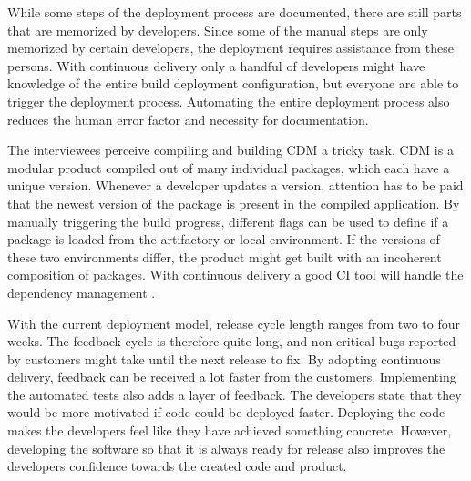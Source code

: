 \documentclass[english]{tktltiki2}
\theoremstyle{definition}
\theoremstyle{remark}
\begin{document}
While some steps of the deployment process are documented, there are still parts that are memorized by developers. Since some of the manual steps are only memorized by certain developers, the deployment requires assistance from these persons. With continuous delivery only a handful of developers might have knowledge of the entire build deployment configuration, but everyone are able to trigger the deployment process. Automating the entire deployment process also reduces the human error factor and necessity for documentation.

The interviewees perceive compiling and building CDM a tricky task. CDM is a modular product compiled out of many individual packages, which each have a unique version. Whenever a developer updates a version, attention has to be paid that the newest version of the package is present in the compiled application. By manually triggering the build progress, different flags can be used to define if a package is loaded from the artifactory or local environment. If the versions of these two environments differ, the product might get built with an incoherent composition of packages. With continuous delivery a good CI tool will handle the dependency management \cite{cdbook}.



With the current deployment model, release cycle length ranges from two to four weeks. The feedback cycle is therefore quite long, and non-critical bugs reported by customers might take until the next release to fix. By adopting continuous delivery, feedback can be received a lot faster from the customers. Implementing the automated tests also adds a layer of feedback. The developers state that they would be more motivated if code could be deployed faster. Deploying the code makes the developers feel like they have achieved something concrete. However, developing the software so that it is always ready for release also improves the developers confidence towards the created code and product.
\end{document}
